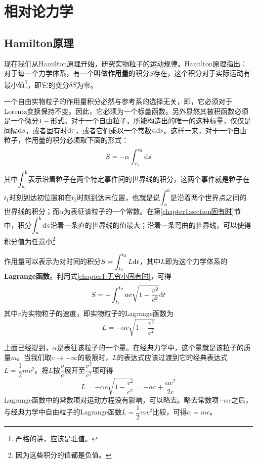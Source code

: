 \chapter{相对论力学}

\section{Hamilton原理}%

现在我们从Hamilton原理开始，研究实物粒子的运动规律。Hamilton原理指出：对于每一个力学体系，有一个叫做{\bf 作用量}的积分$S$存在，这个积分对于实际运动有最小值\footnote{严格的讲，应该是驻值。}，即它的变分$\delta S$为零。

一个自由实物粒子的作用量积分必然与参考系的选择无关，即，它必须对于Lorentz变换保持不变。因此，它必须为一个标量函数。另外显然其被积函数必须是一个微分$1-$形式。对于一个自由粒子，所能构造出的唯一的这种标量，仅仅是间隔$\mathrm{d} s$，或者固有时$\mathrm{d} \tau$，或者它们乘以一个常数$\alpha\mathrm{d} s$。这样一来，对于一个自由粒子，作用量的积分必须取下面的形式：
\begin{equation*}
	S = -\alpha \int_{\tau_1}^{\tau_2} \mathrm{d} s
\end{equation*}
其中$\displaystyle \int_a^b$表示沿着粒子在两个特定事件间的世界线的积分，这两个事件就是粒子在$t_1$时刻到达初位置和在$t_2$时刻到达末位置，也就是说$\displaystyle \int_a^b$是沿着两个世界点之间的世界线的积分；而$\alpha$为表征该粒子的一个常数。在第\ref{chapter1:section固有时}节中，积分$\displaystyle\int_a^b \mathrm{d} s$沿着一条直的世界线的值最大；沿着一条弯曲的世界线，可以使得积分值为任意小\footnote{因为这些积分的值都是负值。}

作用量可以表示为对时间的积分$\displaystyle S = \int_{t_1}^{t_2} L\mathrm{d} t$，其中$L$即为这个力学体系的{\bf Lagrange函数}。利用式\eqref{chapter1:无穷小固有时}，可得
\begin{equation*}
	S = -\int_{t_1}^{t_2} \alpha c\sqrt{1-\frac{v^2}{c^2}} \mathrm{d} t
\end{equation*}
其中$v$为实物粒子的速度，即实物粒子的Lagrange函数为
\begin{equation}
	L = -\alpha c\sqrt{1-\frac{v^2}{c^2}} 
\end{equation}

上面已经提到，$\alpha$是表征该粒子的一个量。在经典力学中，这个量就是该粒子的质量$m$。当我们取$c\to +\infty$的极限时，$L$的表达式应该过渡到它的经典表达式$L=\dfrac12 mv^2$。将$L$按$\dfrac{v}{c}$展开至$\dfrac{v^2}{c^2}$项可得
\begin{equation*}
	L = -\alpha c\sqrt{1-\dfrac{v^2}{c^2}} = -\alpha c+\frac{\alpha v^2}{2c}
\end{equation*}
Lagrange函数中的常数项对运动方程没有影响，可以略去。略去常数项$-\alpha c$之后，与经典力学中自由粒子的Lagrange函数$L=\dfrac12 mv^2$比较，可得$\alpha=mc$。

